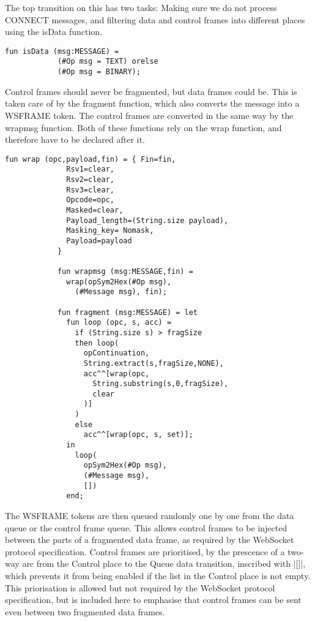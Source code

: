 			The top transition on this has two tasks: Making sure we do not process
			CONNECT messages, and filtering data and control frames into different
			places using the isData function. 
			
			\begin{lstlisting}[label=lst:isData,caption=isData,gobble=3]
			fun isData (msg:MESSAGE) =
			(#Op msg = TEXT) orelse
			(#Op msg = BINARY);
			\end{lstlisting}
			
			Control frames should never be fragmented, but data frames could be. This is
			taken care of by the fragment function, which also converts the message into
			a WSFRAME token. The control frames are converted in the same way by the
			wrapmsg function. Both of these functions rely on the wrap function, and
			therefore have to be declared after it.
			
			
			\begin{lstlisting}[label=lst:fragment,caption=wrap wrapmsg and
			fragment,gobble=3]
			fun wrap (opc,payload,fin) = { Fin=fin,
			  Rsv1=clear,
			  Rsv2=clear,
			  Rsv3=clear,
			  Opcode=opc,
			  Masked=clear,
			  Payload_length=(String.size payload),
			  Masking_key= Nomask,
			  Payload=payload
			}
			
			fun wrapmsg (msg:MESSAGE,fin) = 
			  wrap(opSym2Hex(#Op msg), 
			    (#Message msg), fin);
			    
			fun fragment (msg:MESSAGE) = let
			  fun loop (opc, s, acc) = 
			    if (String.size s) > fragSize
			    then loop(
			      opContinuation,
			      String.extract(s,fragSize,NONE),
			      acc^^[wrap(opc, 
			        String.substring(s,0,fragSize), 
			        clear
			      )]
			    )
			    else 
			      acc^^[wrap(opc, s, set)];
			  in 
			    loop(
			      opSym2Hex(#Op msg), 
			      (#Message msg), 
			      [])
			  end;
			\end{lstlisting}
			
			The WSFRAME tokens are then queued randomly one by one from the data queue or
			the control frame queue. This allows control frames to be injected between
			the parts of a fragmented data frame, as required by the WebSocket protocol
			specification. Control frames are prioritised, by the prescence of a
			two-way arc from the Control place to the Queue data transition, inscribed
			with |[]|, which prevents it from being enabled if the list
			in the Control place is not empty. This priorisation is allowed but not
			required by the WebSocket protocol specification, but is included here to
			emphasise that control frames can be sent even between two fragmented data
			frames.
		
